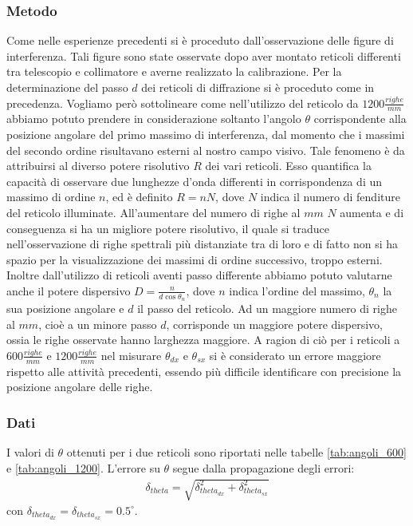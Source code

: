 \documentclass[a4paper]{article}
\begin{document}
\subsubsection{Metodo}
Come nelle esperienze precedenti si è proceduto dall'osservazione delle figure di interferenza. Tali figure sono state osservate dopo aver montato reticoli differenti tra telescopio e collimatore e averne realizzato la calibrazione. Per la determinazione del passo $d$ dei reticoli di diffrazione si è proceduto come in precedenza. Vogliamo però sottolineare come nell'utilizzo del reticolo da $1200 \frac{righe}{mm}$ abbiamo potuto prendere in considerazione soltanto l'angolo $\theta$ corrispondente alla posizione angolare del primo massimo di interferenza, dal momento che i massimi del secondo ordine risultavano esterni al nostro campo visivo. Tale fenomeno è da attribuirsi al diverso potere risolutivo $R$ dei vari reticoli. Esso quantifica la capacità di osservare due lunghezze d'onda differenti in corrispondenza di un massimo di ordine $n$, ed è definito $R=nN$, dove $N$ indica il numero di fenditure del reticolo illuminate. All'aumentare del numero di righe al $mm$ $N$ aumenta e di conseguenza si ha un migliore potere risolutivo, il quale si traduce nell'osservazione di righe spettrali più distanziate tra di loro e di fatto non si ha spazio per la visualizzazione dei massimi di ordine successivo, troppo esterni.
Inoltre dall'utilizzo di reticoli aventi passo differente abbiamo potuto valutarne anche il potere dispersivo $D=\frac{n}{d\cos{\theta_n}}$, dove $n$ indica l'ordine del massimo, $\theta_n$ la sua posizione angolare e $d$ il passo del reticolo. Ad un maggiore numero di righe al $mm$, cioè a un minore passo $d$, corrisponde un maggiore potere dispersivo, ossia le righe osservate hanno larghezza maggiore. A ragion di ciò per i reticoli a $600 \frac{righe}{mm}$ e $1200 \frac{righe}{mm}$ nel misurare $\theta_{dx}$ e $\theta_{sx}$ si è considerato un errore maggiore rispetto alle attività precedenti, essendo più difficile identificare con precisione la posizione angolare delle righe.

\subsubsection{Dati}
I valori di $\theta$ ottenuti per i due reticoli sono riportati nelle tabelle \ref{tab:angoli_600} e \ref{tab:angoli_1200}. L'errore su $\theta$ segue dalla propagazione degli errori:
\begin{align}
\delta_{theta} = \sqrt{\delta_{theta_{dx}}^2+\delta_{theta_{sx}}^2}
\end{align}
con $\delta_{theta_{dx}} =\delta_{theta_{sx}}= 0.5^\circ$.
\end{document}
